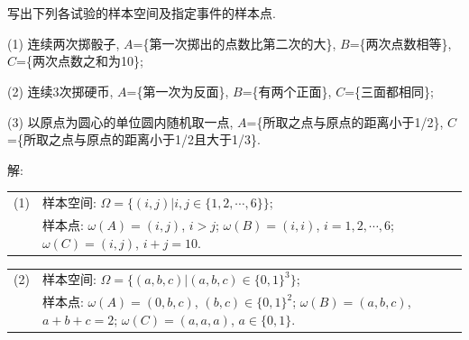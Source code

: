 \documentclass[standard]{ExBook}
\begin{document}


\maketitle 
 

\setcounter{page}{1}
\tableofcontents 
    
\clearpage


\section{}

\begin{qitems}
    \begin{bbox}
    \begin{shaded}
        \qitem 
写出下列各试验的样本空间及指定事件的样本点.

(1) 连续两次掷骰子, $A$=\{第一次掷出的点数比第二次的大\}, $B$=\{两次点数相等\}, $C$=\{两次点数之和为10\};

(2) 连续3次掷硬币, $A$=\{第一次为反面\}, $B$=\{有两个正面\}, $C$=\{三面都相同\};

(3) 以原点为圆心的单位圆内随机取一点, $A$=\{所取之点与原点的距离小于1/2\}, $C$=\{所取之点与原点的距离小于1/2且大于1/3\}.
    \end{shaded}
    \end{bbox}

\vspace{-5em}

    \begin{bbox}
解: 

\begin{flushleft}
\begin{tabular}{ll}
(1) &样本空间: $\Omega=\{(i,j)|i,j\in\{1,2,\cdots,6\}\}$;\\
 &样本点: $\omega(A)=(i,j)$, $i>j$; $\omega(B)=(i,i)$, $i=1,2,\cdots,6$; $\omega(C)=(i,j)$, $i+j=10$.
\end{tabular}
\end{flushleft}

\begin{flushleft}
\begin{tabular}{ll}
(2) &样本空间: $\Omega=\{(a,b,c)|(a,b,c)\in\{0,1\}^3\}$;\\
 &样本点: $\omega(A)=(0,b,c)$, $(b,c)\in\{0,1\}^2$; $\omega(B)=(a,b,c)$, $a+b+c=2$; $\omega(C)=(a,a,a)$, $a\in\{0,1\}$.
\end{tabular}
\end{flushleft}


\end{bbox}
\end{qitems}
\end{document}
